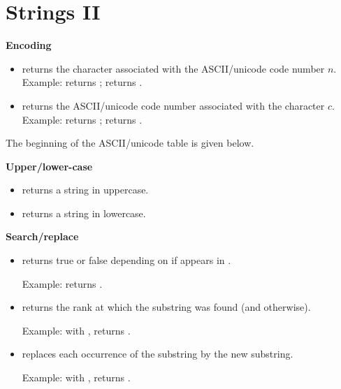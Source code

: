 \documentclass[11pt,class=report,crop=false]{standalone}
\begin{document}
\section{Strings II}



\textbf{Encoding}

\begin{itemize}
  \item {} \quad returns the character associated with the ASCII/unicode code number $n$. Example:  returns ;  returns .
    
  \item {} \quad returns the ASCII/unicode code number associated with the character $c$. Example:  returns ;  returns .
\end{itemize}

The beginning of the ASCII/unicode table is given below.


\bigskip

\textbf{Upper/lower-case}

\begin{itemize}
  \item {} returns a string in uppercase.
  \item {} returns a string in lowercase.  
\end{itemize}

\bigskip

\textbf{Search/replace}

\begin{itemize}
  \item {} \quad returns \og{}true\fg{} or \og{}false\fg{} depending on if  appears in .
  
   Example:
 returns .

  \item {} \quad returns the rank at which the substring was found (and  otherwise).
  
  Example: with ,  returns .
  
   \item {} \quad replaces 
   each occurrence of the substring by the new substring.
   
   Example: with ,  returns
   .

\end{itemize}
\end{document}
